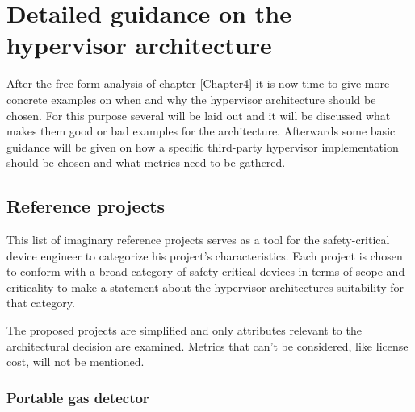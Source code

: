 
\chapter{Detailed guidance on the hypervisor architecture} %

\label{Chapter5} %



After the free form analysis of chapter \ref{Chapter4} it is now time to give more concrete examples on when and why the hypervisor architecture should be chosen. For this purpose several  will be laid out and it will be discussed what makes them good or bad examples for the architecture. Afterwards some basic guidance will be given on how a specific third-party hypervisor implementation should be chosen and what metrics need to be gathered.
\section{Reference projects} \label{ref-projects}
This list of imaginary reference projects serves as a tool for the safety-critical device engineer to categorize his project's characteristics. Each project is chosen to conform with a broad category of safety-critical devices in terms of scope and criticality to make a statement about the hypervisor architectures suitability for that category.

The proposed projects are simplified and only attributes relevant to the architectural decision are examined. Metrics that can't be considered, like license cost, will not be mentioned. 

\subsection{Portable gas detector}
